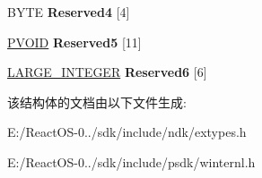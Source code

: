 \begin{DoxyCompactItemize}
\item 
\mbox{\label{struct___s_y_s_t_e_m___p_r_o_c_e_s_s___i_n_f_o_r_m_a_t_i_o_n_a527323eea29cbd91db27839916c832a0}} 
B\+Y\+TE {\bfseries Reserved4} \mbox{[}4\mbox{]}
\item 
\mbox{\label{struct___s_y_s_t_e_m___p_r_o_c_e_s_s___i_n_f_o_r_m_a_t_i_o_n_a729544692f91fc6124c83e70bfaffac7}} 
\hyperlink{interfacevoid}{P\+V\+O\+ID} {\bfseries Reserved5} \mbox{[}11\mbox{]}
\item 
\mbox{\label{struct___s_y_s_t_e_m___p_r_o_c_e_s_s___i_n_f_o_r_m_a_t_i_o_n_a69c578ae606784a4efdeb09a5af5ab64}} 
\hyperlink{union___l_a_r_g_e___i_n_t_e_g_e_r}{L\+A\+R\+G\+E\+\_\+\+I\+N\+T\+E\+G\+ER} {\bfseries Reserved6} \mbox{[}6\mbox{]}
\end{DoxyCompactItemize}


该结构体的文档由以下文件生成\+:\begin{DoxyCompactItemize}
\item 
E\+:/\+React\+O\+S-\/0../sdk/include/ndk/extypes.\+h\item 
E\+:/\+React\+O\+S-\/0../sdk/include/psdk/winternl.\+h\end{DoxyCompactItemize}

